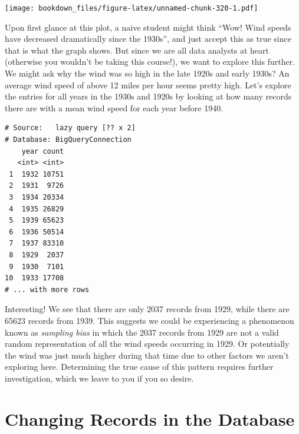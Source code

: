 \documentclass[]{krantz}
\makeatletter
\newenvironment{Shaded}{\begin{snugshade}}{\end{snugshade}}
\newcommand{\KeywordTok}[1]{\textcolor[rgb]{0.27,0.27,0.27}{\textbf{#1}}}
\newcommand{\DataTypeTok}[1]{\textcolor[rgb]{0.27,0.27,0.27}{#1}}
\newcommand{\DecValTok}[1]{\textcolor[rgb]{0.06,0.06,0.06}{#1}}
\newcommand{\StringTok}[1]{\textcolor[rgb]{0.5,0.5,0.5}{#1}}
\newcommand{\OperatorTok}[1]{\textcolor[rgb]{0.43,0.43,0.43}{\textbf{#1}}}
\newcommand{\NormalTok}[1]{#1}
\newenvironment{kframe}{%
\medskip{}
\setlength{\fboxsep}{.8em}
 \def\at@end@of@kframe{}%
 \ifinner\ifhmode%
  \def\at@end@of@kframe{\end{minipage}}%
  \begin{minipage}{\columnwidth}%
 \fi\fi%
 \def\FrameCommand##1{\hskip\@totalleftmargin \hskip-\fboxsep
 \colorbox{shadecolor}{##1}\hskip-\fboxsep
     \hskip-\linewidth \hskip-\@totalleftmargin \hskip\columnwidth}%
 \MakeFramed {\advance\hsize-\width
   \@totalleftmargin\z@ \linewidth\hsize
   \@setminipage}}%
 {\par\unskip\endMakeFramed%
 \at@end@of@kframe}
\renewenvironment{Shaded}{\begin{kframe}}{\end{kframe}}
\makeatother
\begin{document}
\texttt{[image: bookdown\_files/figure-latex/unnamed-chunk-320-1.pdf]}

Upon first glance at this plot, a naive student might think ``Wow! Wind
speeds have decreased dramatically since the 1930s'', and just accept
this as true since that is what the graph shows. But since we are all
data analysts at heart (otherwise you wouldn't be taking this course!),
we want to explore this further. We might ask why the wind was so high
in the late 1920s and early 1930s? An average wind speed of above 12
miles per hour seems pretty high. Let's explore the entries for all
years in the 1930s and 1920s by looking at how many records there are
with a mean wind speed for each year before 1940.

\begin{Shaded}
\end{Shaded}

\begin{verbatim}
# Source:   lazy query [?? x 2]
# Database: BigQueryConnection
    year count
   <int> <int>
 1  1932 10751
 2  1931  9726
 3  1934 20334
 4  1935 26829
 5  1939 65623
 6  1936 50514
 7  1937 83310
 8  1929  2037
 9  1930  7101
10  1933 17708
# ... with more rows
\end{verbatim}

Interesting! We see that there are only 2037 records from 1929, while
there are 65623 records from 1939. This suggests we could be
experiencing a phenomenon known as \emph{sampling bias} in which the
2037 records from 1929 are not a valid random representation of all the
wind speeds occurring in 1929. Or potentially the wind was just much
higher during that time due to other factors we aren't exploring here.
Determining the true cause of this pattern requires further
investigation, which we leave to you if you so desire.

\section{Changing Records in the
Database}\label{changing-records-in-the-database}
\end{document}
